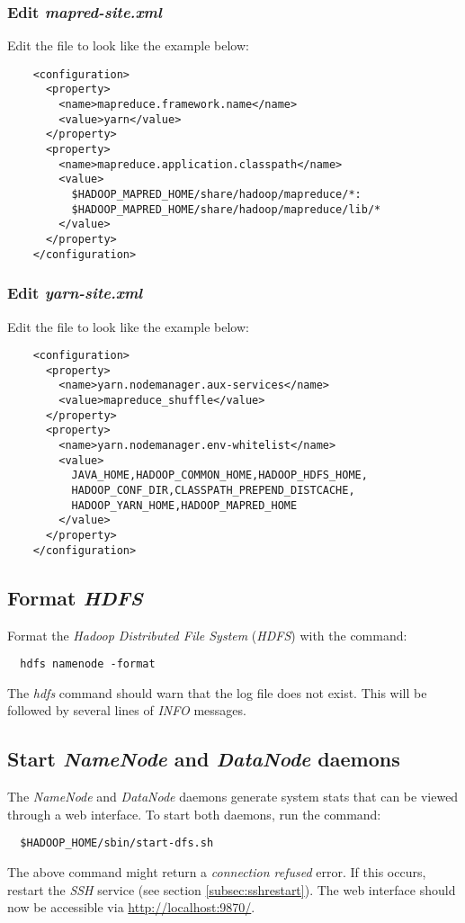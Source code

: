 \documentclass{article}
\begin{document}
    \subsubsection{Edit \emph{mapred-site.xml}}
    Edit the file  to look like the example
    below:
    \begin{verbatim}
    <configuration>
      <property>
        <name>mapreduce.framework.name</name>
        <value>yarn</value>
      </property>
      <property>
        <name>mapreduce.application.classpath</name>
        <value>
          $HADOOP_MAPRED_HOME/share/hadoop/mapreduce/*:
          $HADOOP_MAPRED_HOME/share/hadoop/mapreduce/lib/*
        </value>
      </property>
    </configuration>
    \end{verbatim}
        
    \subsubsection{Edit \emph{yarn-site.xml}}
    Edit the file  to look like the example below:
    \begin{verbatim}
    <configuration>
      <property>
        <name>yarn.nodemanager.aux-services</name>
        <value>mapreduce_shuffle</value>
      </property>
      <property>
        <name>yarn.nodemanager.env-whitelist</name>
        <value>
          JAVA_HOME,HADOOP_COMMON_HOME,HADOOP_HDFS_HOME,
          HADOOP_CONF_DIR,CLASSPATH_PREPEND_DISTCACHE,
          HADOOP_YARN_HOME,HADOOP_MAPRED_HOME
        </value>
      </property>
    </configuration>
    \end{verbatim}

  \subsection{Format \emph{HDFS}}
  Format the \emph{Hadoop Distributed File System} (\emph{HDFS}) with the command:
  \begin{verbatim}
  hdfs namenode -format
  \end{verbatim}
  The \emph{hdfs} command should warn that the log file does not exist. This will be followed
  by several lines of \emph{INFO} messages.

  \subsection{Start \emph{NameNode} and \emph{DataNode} daemons}
  The \emph{NameNode} and \emph{DataNode} daemons generate system stats that can be viewed
  through a web interface. To start both daemons, run the command:
  \begin{verbatim}
  $HADOOP_HOME/sbin/start-dfs.sh
  \end{verbatim}
  The above command might return a \emph{connection refused} error. If this occurs, restart
  the \emph{SSH} service (see section \ref{subsec:sshrestart}). The web interface should now be
  accessible via \url{http://localhost:9870/}.
\end{document}
